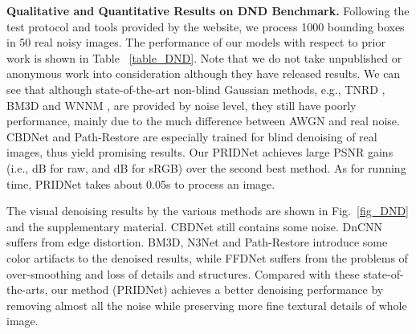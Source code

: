 \documentclass[conference]{IEEEtran}
\begin{document}
\begin{table}
\caption{Ablation study of our model on validation dataset of SIDD.}
\begin{center}
\label{table_ablation}
\end{center}
\end{table}
\textbf{Qualitative and Quantitative Results on DND Benchmark.}  Following the test protocol and tools provided by the website, we process 1000 bounding boxes in 50 real noisy images. The performance of our models with respect to prior work is shown in Table ~\ref{table_DND}. Note that we do not take unpublished or anonymous work into consideration although they have released results. We can see that although state-of-the-art non-blind Gaussian methods, e.g., TNRD \cite{TNRD}, BM3D \cite{BM3D} and WNNM \cite{WNNM}, are provided by noise level, they still have poorly performance, mainly due to the much difference between AWGN and real noise. CBDNet \cite{CBDNet} and Path-Restore \cite{path-restore} are especially trained for blind denoising of real images, thus yield promising results.
Our PRIDNet achieves large PSNR gains (i.e., dB for raw, and dB for sRGB) over the second best method. As for running time, PRIDNet takes about 0.05s to process an  image.

The visual denoising results by the various methods are shown in Fig.~\ref{fig_DND} and the supplementary material. CBDNet \cite{CBDNet} still contains some noise. DnCNN \cite{DnCNN} suffers from edge distortion. BM3D, N3Net and Path-Restore introduce some color artifacts to the denoised results, while FFDNet \cite{FFDNet} suffers from the problems of over-smoothing and loss of details and structures. Compared with these state-of-the-arts, our method (PRIDNet) achieves a better denoising performance by removing almost all the noise while preserving more fine textural details of whole image.
\end{document}

